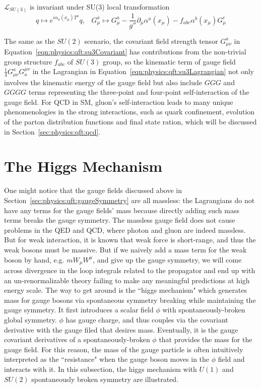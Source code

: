 \noindent $\mathcal{L}_{SU(3)}$ is invariant under SU(3) local transformation 
\begin{equation}
	q \longmapsto  e^{i\alpha_a (x_\mu) T^a} q , \;\;\; 
    G^a_\mu \longmapsto  G^a_\mu - \frac{1}{g''}\partial_\mu \alpha^a(x_\mu) - f_{abc}\alpha^b(x_\mu) G^c_\mu 
\end{equation}



\noindent The same as the $SU(2)$  scenario, the covariant field strength tensor $G^a_{\mu\nu}$ in Equation~\ref{eqn:physics:qft:su3Covariant}  has contributions from the non-trivial group structure $f_{abc}$ of $SU(3)$ group, so the kinematic term of gauge field $\frac{1}{4}G^a_{\mu\nu}G^{\mu\nu}_a$ in the Lagrangian in Equation~\ref{eqn:physics:qft:su3Lagrangian} not only involves the kinematic energy of the gauge field but also include $GGG$ and $GGGG$ terms representing the three-point and four-point self-interaction of the gauge field. For QCD in SM, gluon's self-interaction leads to many unique phenomenologies in the strong interactions, such as quark confinement, evolution of the parton distribution functions and final state ration, which will be discussed in Section~\ref{sec:physics:qft:qcd}.





\section{The Higgs Mechanism}
\label{sec:physics:qft:higgsMechanism}
One might notice that the gauge fields discussed above in Section~\ref{sec:physics:qft:gaugeSymmetry} are all massless: the Lagrangians do not have any terms for the gauge fields' mass because directly adding such mass terms breaks the gauge symmetry. The massless gauge field does not cause problems in the QED and QCD, where photon and gluon are indeed massless. But for weak interaction, it is known that weak force is short-range, and thus the weak bosons must be massive. But if we naively add a mass term for the weak boson by hand, e.g. $m W_\mu W^\mu$, and give up the gauge symmetry, we will come across divergence in the loop integrals related to the propagator and end up with an un-renormalizable theory failing to make any meaningful predictions at high energy scale. The way to get around is the ``higgs mechanism" which generates mass for gauge bosons via spontaneous symmetry breaking while maintaining the gauge symmetry. It first introduces a scalar field $\phi$ with spontaneously-broken global symmetry. $\phi$ has gauge charge, and thus couples via the covariant derivative with the gauge filed that desires mass. Eventually, it is the gauge covariant derivatives of a spontaneously-broken $\phi$ that provides the mass for the gauge field. For this reason, the mass of the gauge particle is often intuitively interpreted as the ``resistance" when the gauge boson moves in the $\phi$ field and interacts with it. In this subsection, the higgs mechanism with $U(1)$ and $SU(2)$ spontaneously broken symmetry are illustrated.

